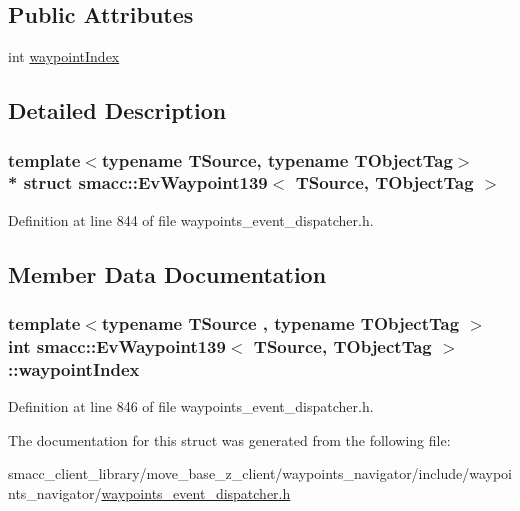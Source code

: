 \subsection*{Public Attributes}
\begin{DoxyCompactItemize}
\item 
int \hyperlink{structsmacc_1_1EvWaypoint139_ae432aef59d1ffc1142e89e71ed5ad1bc}{waypoint\+Index}
\end{DoxyCompactItemize}


\subsection{Detailed Description}
\subsubsection*{template$<$typename T\+Source, typename T\+Object\+Tag$>$\\*
struct smacc\+::\+Ev\+Waypoint139$<$ T\+Source, T\+Object\+Tag $>$}



Definition at line 844 of file waypoints\+\_\+event\+\_\+dispatcher.\+h.



\subsection{Member Data Documentation}
\subsubsection[{\texorpdfstring{waypoint\+Index}{waypointIndex}}]{\setlength{\rightskip}{0pt plus 5cm}template$<$typename T\+Source , typename T\+Object\+Tag $>$ int {\bf smacc\+::\+Ev\+Waypoint139}$<$ T\+Source, T\+Object\+Tag $>$\+::waypoint\+Index}\hypertarget{structsmacc_1_1EvWaypoint139_ae432aef59d1ffc1142e89e71ed5ad1bc}{}\label{structsmacc_1_1EvWaypoint139_ae432aef59d1ffc1142e89e71ed5ad1bc}


Definition at line 846 of file waypoints\+\_\+event\+\_\+dispatcher.\+h.



The documentation for this struct was generated from the following file\+:\begin{DoxyCompactItemize}
\item 
smacc\+\_\+client\+\_\+library/move\+\_\+base\+\_\+z\+\_\+client/waypoints\+\_\+navigator/include/waypoints\+\_\+navigator/\hyperlink{waypoints__event__dispatcher_8h}{waypoints\+\_\+event\+\_\+dispatcher.\+h}\end{DoxyCompactItemize}
